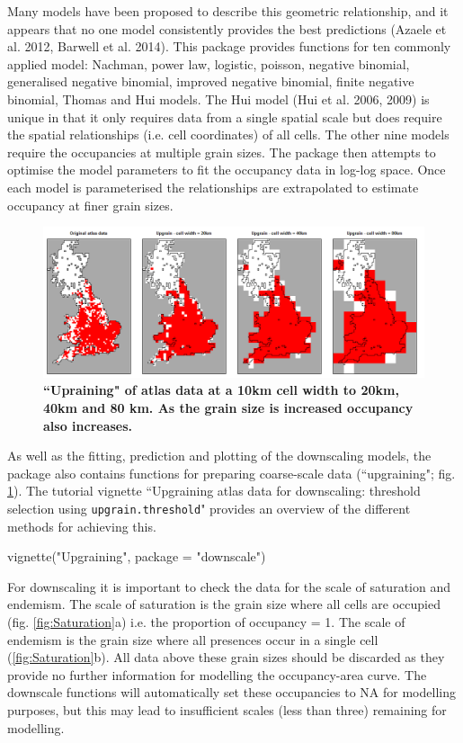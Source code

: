 \documentclass{article}[12pt, a4paper]
\begin{document}
Many models have been proposed to describe this geometric relationship, and it appears that no one model consistently provides the best predictions (Azaele et al. 2012, Barwell et al. 2014). This package provides functions for ten commonly applied model: Nachman, power law, logistic, poisson, negative binomial, generalised negative binomial, improved negative binomial, finite negative binomial, Thomas and Hui models. The Hui model (Hui et al. 2006, 2009) is unique in that it only requires data from a single spatial scale but does require the spatial relationships (i.e. cell coordinates) of all cells. The other nine models require the occupancies at multiple grain sizes. The package then attempts to optimise the model parameters to fit the occupancy data in log-log space. Once each model is parameterised the relationships are extrapolated to estimate occupancy at finer grain sizes.

\begin{figure}[!h]
\centering
\includegraphics[width=14.5cm]{Original_upgrain.png}
\caption{\textbf{``Upraining" of atlas data at a 10km cell width to 20km, 40km and 80 km. As the grain size is increased occupancy also increases.}}
\label{fig:Original_upgrain}
\end{figure}

As well as the fitting, prediction and plotting of the downscaling models, the package also contains functions for preparing coarse-scale data (``upgraining"; fig. \ref{fig:Original_upgrain}). The tutorial vignette ``Upgraining atlas data for downscaling: threshold
selection using \texttt{upgrain.threshold}"  provides an overview of the different methods for achieving this.

\begin{Schunk}
\begin{Sinput}
vignette("Upgraining", package = "downscale")
\end{Sinput}
\end{Schunk}

For downscaling it is important to check the data for the scale of saturation and endemism. The scale of saturation is the grain size where all cells are occupied (fig. \ref{fig:Saturation}a) i.e. the proportion of occupancy = 1. The scale of endemism is the grain size where all presences occur in a single cell (\ref{fig:Saturation}b). All data above these grain sizes should be discarded as they provide no further information for modelling the occupancy-area curve. The downscale functions will automatically set these occupancies to NA for modelling purposes, but this may lead to insufficient scales (less than three) remaining for modelling.
\end{document}
